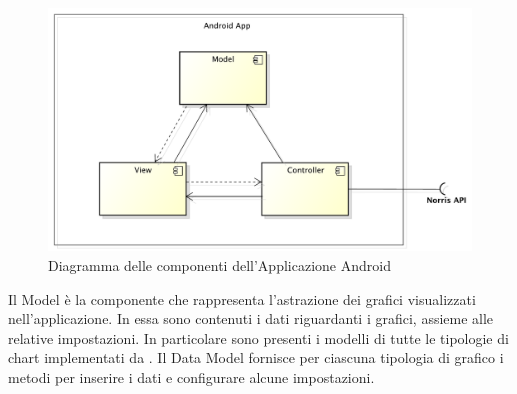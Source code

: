 	\begin{figure}[H]\centering
        \includegraphics[width=\textwidth]{SpecificaTecnica/Pics/ComponentiApplicazione}
        \caption{Diagramma delle componenti dell'Applicazione Android}
    \end{figure}
        Il Model è la componente che rappresenta l'astrazione dei grafici visualizzati nell'applicazione. In essa sono contenuti i dati riguardanti i grafici, assieme alle relative impostazioni. In particolare sono presenti i modelli di tutte le tipologie di chart implementati da . Il Data Model fornisce per ciascuna tipologia di grafico i metodi per inserire i dati e configurare alcune impostazioni. 
    
